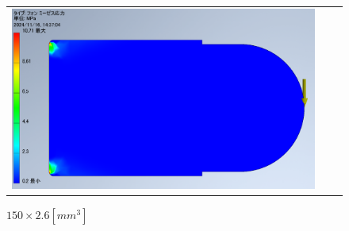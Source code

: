 \begin{figure}[H]
\begin{tabular}{ccc}
\begin{minipage}{.25\textwidth}
        \caption{$120\times3.3[mm^3]$}
        \label{img:4-7_voms}
      \end{minipage}
      \begin{minipage}{.25\textwidth}
        \centering
        \includegraphics[width=0.99\linewidth]{images/4-8_voms.png}
        \caption{$150\times2.6[mm^3]$}
        \label{img:4-8_voms}
      \end{minipage}
    \end{tabular}
  \end{figure}

